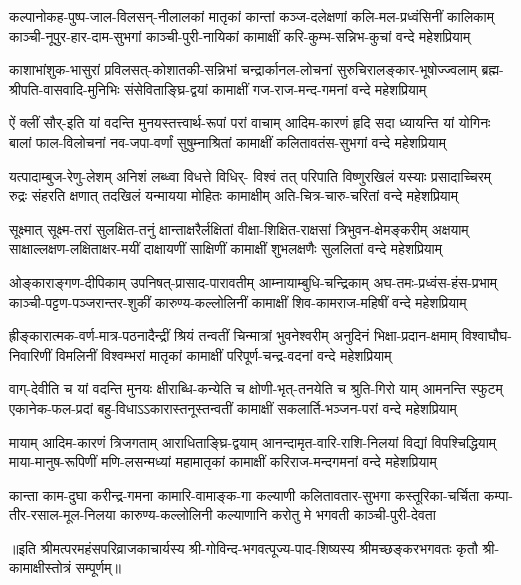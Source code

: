
\setlength{\shlokaspaceskip}{16pt}
\fourlineindentedshloka
{कल्पानोकह-पुष्प-जाल-विलसन्-नीलालकां मातृकां}
{कान्तां कञ्ज-दलेक्षणां कलि-मल-प्रध्वंसिनीं कालिकाम्}
{काञ्ची-नूपुर-हार-दाम-सुभगां काञ्ची-पुरी-नायिकां}
{कामाक्षीं करि-कुम्भ-सन्निभ-कुचां वन्दे महेशप्रियाम्}%

\fourlineindentedshloka
{काशाभांशुक-भासुरां प्रविलसत्-कोशातकी-सन्निभां}
{चन्द्रार्कानल-लोचनां सुरुचिरालङ्कार-भूषोज्ज्वलाम्}
{ब्रह्म-श्रीपति-वासवादि-मुनिभिः संसेविताङ्घ्रि-द्वयां}
{कामाक्षीं गज-राज-मन्द-गमनां वन्दे महेशप्रियाम्}%

\fourlineindentedshloka
{ऐं क्लीं सौर्-इति यां वदन्ति मुनयस्तत्त्वार्थ-रूपां परां}
{वाचाम् आदिम-कारणं हृदि सदा ध्यायन्ति यां योगिनः}
{बालां फाल-विलोचनां नव-जपा-वर्णां सुषुम्नाश्रितां}
{कामाक्षीं कलितावतंस-सुभगां वन्दे महेशप्रियाम्}%

\fourlineindentedshloka
{यत्पादाम्बुज-रेणु-लेशम् अनिशं लब्ध्वा विधत्ते विधिर्-}
{विश्वं तत् परिपाति विष्णुरखिलं यस्याः प्रसादाच्चिरम्}
{रुद्रः संहरति क्षणात् तदखिलं यन्मायया मोहितः}
{कामाक्षीम् अति-चित्र-चारु-चरितां वन्दे महेशप्रियाम्}%

\fourlineindentedshloka
{सूक्ष्मात् सूक्ष्म-तरां सुलक्षित-तनुं क्षान्ताक्षरैर्लक्षितां}
{वीक्षा-शिक्षित-राक्षसां त्रिभुवन-क्षेमङ्करीम् अक्षयाम्}
{साक्षाल्लक्षण-लक्षिताक्षर-मयीं दाक्षायणीं साक्षिणीं}
{कामाक्षीं शुभलक्षणैः सुललितां वन्दे महेशप्रियाम्}%

\fourlineindentedshloka
{ओङ्काराङ्गण-दीपिकाम् उपनिषत्-प्रासाद-पारावतीम्}
{आम्नायाम्बुधि-चन्द्रिकाम् अघ-तमः-प्रध्वंस-हंस-प्रभाम्}
{काञ्ची-पट्टण-पञ्जरान्तर-शुकीं कारुण्य-कल्लोलिनीं}
{कामाक्षीं शिव-कामराज-महिषीं वन्दे महेशप्रियाम्}%

\fourlineindentedshloka
{ह्रीङ्कारात्मक-वर्ण-मात्र-पठनादैन्द्रीं श्रियं तन्वतीं}
{चिन्मात्रां भुवनेश्वरीम् अनुदिनं भिक्षा-प्रदान-क्षमाम्}
{विश्वाघौघ-निवारिणीं विमलिनीं विश्वम्भरां मातृकां}
{कामाक्षीं परिपूर्ण-चन्द्र-वदनां वन्दे महेशप्रियाम्}%

\fourlineindentedshloka
{वाग्-देवीति च यां वदन्ति मुनयः क्षीराब्धि-कन्येति च}
{क्षोणी-भृत्-तनयेति च श्रुति-गिरो याम् आमनन्ति स्फुटम्}
{एकानेक-फल-प्रदां बहु-विधाऽऽकारास्तनूस्तन्वतीं}
{कामाक्षीं सकलार्ति-भञ्जन-परां वन्दे महेशप्रियाम्}%

\fourlineindentedshloka
{मायाम् आदिम-कारणं त्रिजगताम् आराधिताङ्घ्रि-द्वयाम्}
{आनन्दामृत-वारि-राशि-निलयां विद्यां विपश्चिद्धियाम्}
{माया-मानुष-रूपिणीं मणि-लसन्मध्यां महामातृकां}
{कामाक्षीं करिराज-मन्दगमनां वन्दे महेशप्रियाम्}%

\fourlineindentedshloka
{कान्ता काम-दुघा करीन्द्र-गमना कामारि-वामाङ्क-गा}
{कल्याणी कलितावतार-सुभगा कस्तूरिका-चर्चिता}
{कम्पा-तीर-रसाल-मूल-निलया कारुण्य-कल्लोलिनी}
{कल्याणानि करोतु मे भगवती काञ्ची-पुरी-देवता}%

{॥इति श्रीमत्परमहंसपरिव्राजकाचार्यस्य श्री-गोविन्द-भगवत्पूज्य-पाद-शिष्यस्य
श्रीमच्छङ्करभगवतः कृतौ श्री-कामाक्षीस्तोत्रं सम्पूर्णम्॥}
\setlength{\shlokaspaceskip}{24pt}
